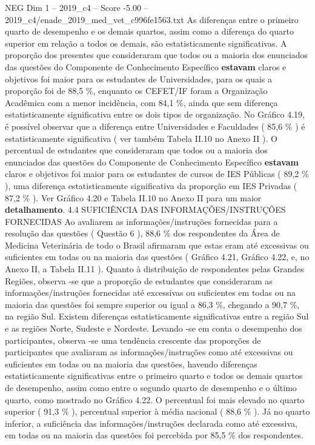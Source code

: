 \begin{textsample}{NEG Dim 1 – 2019\_c4 – Score -5.00 – 2019\_c4/enade\_2019\_med\_vet\_c996fe1563.txt}
As diferenças entre o primeiro quarto de desempenho e os demais quartos, assim como a diferença do quarto superior em relação a todos os demais, são estatisticamente significativas.
A proporção dos presentes que consideraram que todos ou a maioria dos enunciados das questões do Componente de Conhecimento Específico \textbf{estavam} claros e objetivos foi maior para os estudantes de Universidades, para os quais a proporção foi de 88,5 \%, enquanto os CEFET/IF foram a Organização Acadêmica com a menor incidência, com 84,1 \%, ainda que sem diferença estatisticamente significativa entre os dois tipos de organização.
No Gráfico 4.19, é possível observar que a diferença entre Universidades e Faculdades ( 85,6 \% ) é estatisticamente significativa ( ver também Tabela II.10 no Anexo II ).
O percentual de estudantes que consideraram que todos ou a maioria dos enunciados das questões do Componente de Conhecimento Específico \textbf{estavam} claros e objetivos foi maior para os estudantes de cursos de IES Públicas ( 89,2 \% ), uma diferença estatisticamente significativa da proporção em IES Privadas ( 87,2 \% ).
Ver Gráfico 4.20 e Tabela II.10 no Anexo II para um maior \textbf{detalhamento}. 4.4 SUFICIÊNCIA DAS INFORMAÇÕES/INSTRUÇÕES FORNECIDAS Ao avaliarem as informações/instruções fornecidas para a resolução das questões ( Questão 6 ), 88,6 \% dos respondentes da Área de Medicina Veterinária de todo o Brasil afirmaram que estas eram até excessivas ou suficientes em todas ou na maioria das questões ( Gráfico 4.21, Gráfico 4.22, e, no Anexo II, a Tabela II.11 ).
Quanto à distribuição de respondentes pelas Grandes Regiões, observa -se que a proporção de estudantes que consideraram as informações/instruções fornecidas até excessivas ou suficientes em todas ou na maioria das questões foi sempre superior ou igual a 86,3 \%, chegando a 90,7 \%, na região Sul.
Existem diferenças estatisticamente significativas entre a região Sul e as regiões Norte, Sudeste e Nordeste.
Levando -se em conta o desempenho dos participantes, observa -se uma tendência crescente das proporções de participantes que avaliaram as informações/instruções como até excessivas ou suficientes em todas ou na maioria das questões, havendo diferenças estatisticamente significativas entre o primeiro quarto e todos os demais quartos de desempenho, assim como entre o segundo quarto de desempenho e o último quarto, como mostrado no Gráfico 4.22.
O percentual foi mais elevado no quarto superior ( 91,3 \% ), percentual superior à média nacional ( 88,6 \% ).
Já no quarto inferior, a suficiência das informações/instruções declarada como até excessiva, em todas ou na maioria das questões foi percebida por 85,5 \% dos respondentes.

\end{textsample}
